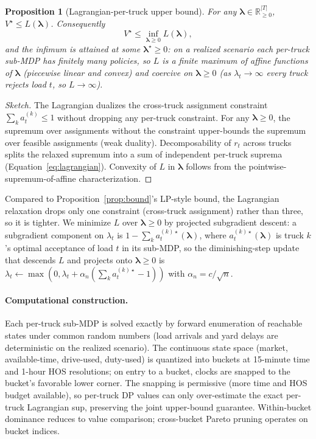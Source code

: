 \documentclass[11pt]{article}
\newtheorem{proposition}{Proposition}
\begin{document}
\begin{proposition}[Lagrangian-per-truck upper bound]
\label{prop:lagrangian}
For any $\boldsymbol{\lambda} \in \mathbb{R}_{\geq 0}^{|T|}$,
$V^\star \leq L(\boldsymbol{\lambda})$. Consequently
\begin{equation}
  V^\star \leq \inf_{\boldsymbol{\lambda} \geq 0} L(\boldsymbol{\lambda}),
\end{equation}
and the infimum is attained at some $\boldsymbol{\lambda}^\star \geq 0$:
on a realized scenario each per-truck sub-MDP has finitely many policies,
so $L$ is a finite maximum of affine functions of $\boldsymbol{\lambda}$
(piecewise linear and convex) and coercive on $\boldsymbol{\lambda} \geq 0$
(as $\lambda_t \to \infty$ every truck rejects load $t$, so
$L \to \infty$).
\end{proposition}

\begin{proof}[Sketch]
The Lagrangian dualizes the cross-truck assignment constraint
$\sum_k a^{(k)}_t \leq 1$ without dropping any per-truck constraint.
For any $\boldsymbol{\lambda} \geq 0$, the supremum over assignments
without the constraint upper-bounds the supremum over feasible
assignments (weak duality). Decomposability of $r_t$ across trucks
splits the relaxed supremum into a sum of independent per-truck suprema
(Equation~\ref{eq:lagrangian}). Convexity of $L$ in
$\boldsymbol{\lambda}$ follows from the pointwise-supremum-of-affine
characterization.
\end{proof}

Compared to Proposition~\ref{prop:bound}'s LP-style bound, the
Lagrangian relaxation drops only one constraint (cross-truck
assignment) rather than three, so it is tighter. We minimize $L$ over
$\boldsymbol{\lambda} \geq 0$ by projected subgradient descent: a
subgradient component on $\lambda_t$ is
$1 - \sum_k a^{(k)\star}_t(\boldsymbol{\lambda})$, where
$a^{(k)\star}_t(\boldsymbol{\lambda})$ is truck $k$'s optimal
acceptance of load $t$ in its sub-MDP, so the diminishing-step update
that descends $L$ and projects onto $\boldsymbol{\lambda} \geq 0$ is
$\lambda_t \leftarrow \max(0, \lambda_t + \alpha_n (\sum_k a^{(k)\star}_t - 1))$
with $\alpha_n = c / \sqrt{n}$.

\paragraph{Computational construction.}
Each per-truck sub-MDP is solved exactly by forward enumeration of
reachable states under common random numbers (load arrivals and yard
delays are deterministic on the realized scenario). The continuous
state space (market, available-time, drive-used, duty-used) is
quantized into buckets at 15-minute time and 1-hour HOS resolutions;
on entry to a bucket, clocks are snapped to the bucket's favorable
lower corner. The snapping is permissive (more time and HOS budget
available), so per-truck DP values can only over-estimate the exact
per-truck Lagrangian sup, preserving the joint upper-bound guarantee.
Within-bucket dominance reduces to value comparison; cross-bucket
Pareto pruning operates on bucket indices.
\end{document}
